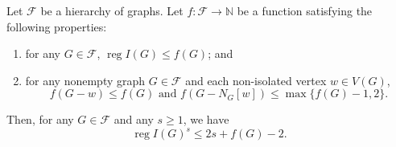 \documentclass[ALCO,ThmDefs,Unicode,epreuves]{cedram}
\DeclareMathOperator{\reg}{reg}
\newcommand{\NN}{{\mathbb N}}
\newcommand{\F}{\mathcal{F}}
\newcommand*{\reg}{\mathrm{reg}}
\begin{document}
\begin{theo} \label{thm.hierarchy}
Let $\F$ be a hierarchy of graphs. Let $f : \F \longrightarrow \NN$ be a function satisfying the following properties:
\begin{enumerate}
\item\label{theo3.3_1} for any $G \in \F$, $\reg I(G) \le f(G)$; and
\item\label{theo3.3_2} for any nonempty graph $G \in \F$ and each non-isolated vertex $w \in V(G)$,
 \[
f(G-w) \le f(G) \text{ and } f(G - N_G[w]) \le \max\{f(G)-1, 2\}.
\]

\end{enumerate}
Then, for any $G \in \F$ and any $s \ge 1$, we have
\[
\reg I(G)^s \le 2s + f(G) - 2.
\]

\end{theo}
\end{document}
